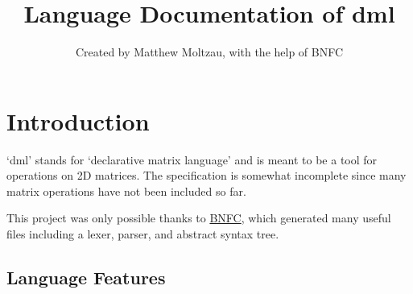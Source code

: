 \documentclass[a4paper,11pt]{article}
\title{Language Documentation of dml}
\author{Created by Matthew Moltzau, with the help of BNFC}
\begin{document}
\maketitle

\newcommand{\emptyP}{\mbox{$\epsilon$}}
\newcommand{\terminal}[1]{\mbox{{\texttt {#1}}}}
\newcommand{\nonterminal}[1]{\mbox{$\langle \mbox{{\sl #1 }} \! \rangle$}}
\newcommand{\arrow}{\mbox{::=}}
\newcommand{\delimit}{\mbox{$|$}}
\newcommand{\reserved}[1]{\mbox{{\texttt {#1}}}}
\newcommand{\literal}[1]{\mbox{{\texttt {#1}}}}
\newcommand{\symb}[1]{\mbox{{\texttt {#1}}}}

\section*{Introduction}

`dml' stands for `declarative matrix language' and is meant to be a tool for operations
on 2D matrices. The specification is somewhat incomplete since many matrix operations
have not been included so far.

This project was only possible thanks to \href{http://bnfc.digitalgrammars.com}{BNFC}, which
generated many useful files including a lexer, parser, and abstract syntax tree.

\subsection*{Language Features}
\end{document}
